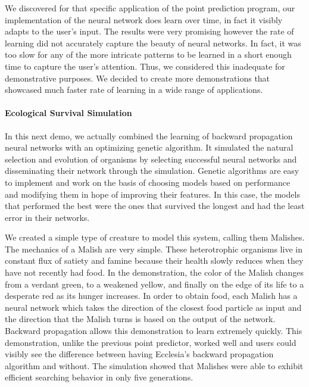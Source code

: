 \documentclass[letterpaper, 10pt]{article}
\begin{document}
		We discovered for that specific application of the point prediction program, our implementation of the neural network does learn over time, in fact it visibly adapts to the user's input. The results were very promising however the rate of learning did not accurately capture the beauty of neural networks. In fact, it was too slow for any of the more intricate patterns to be learned in a short enough time to capture the user's attention. Thus, we considered this inadequate for demonstrative purposes. We decided to create more demonstrations that showcased much faster rate of learning in a wide range of applications.
		
		\paragraph{Ecological Survival Simulation}
		In this next demo, we actually combined the learning of backward propagation neural networks with an optimizing genetic algorithm. It simulated the natural selection and evolution of organisms by selecting successful neural networks and disseminating their network through the simulation. Genetic algorithms are easy to implement and work on the basis of choosing models based on performance and modifying them in hope of improving their features. In this case, the models that performed the best were the ones that survived the longest and had the least error in their networks.
		
		We created a simple type of creature to model this system, calling them Malishes. The mechanics of a Malish are very simple. These heterotrophic organisms live in constant flux of satiety and famine because their health slowly reduces when they have not recently had food. In the demonstration, the color of the Malish changes from a verdant green, to a weakened yellow, and finally on the edge of its life to a desperate red as its hunger increases. In order to obtain food, each Malish has a neural network which takes the direction of the closest food particle as input and the direction that the Malish turns is based on the output of the network. Backward propagation allows this demonstration to learn extremely quickly. This demonstration, unlike the previous point predictor, worked well and users could visibly see the difference between having Ecclesia's backward propagation algorithm and without. The simulation showed that Malishes were able to exhibit efficient searching behavior in only five generations.
		
\end{document}
